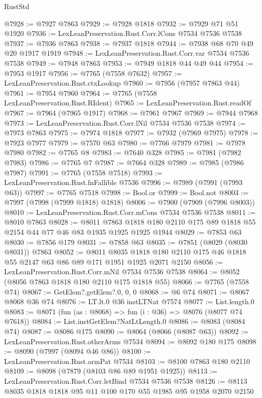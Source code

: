 \begin{lexlean}{RustStd}
\begin{coremodule}
@7928 := @7927 @7863
@7929 := @7928 @1818
@7932 := @7929 @71 @51 @1920
@7936 := LexLeanPreservation.Rust.Corr.lCons @7534 @7536 @7538
@7937 := @7936 @7863
@7938 := @7937 @1818
@7944 := @7938 @68 @70 @49 @20 @1917 @1919
@7948 := LexLeanPreservation.Rust.Corr.var @7534 @7536 @7538
@7949 := @7948 @7863
@7953 := @7949 @1818 @44 @49 @44
@7954 := @7953 @1917
@7956 := @7765 (@7558 @7632)
@7957 := LexLeanPreservation.Rust.ctxLookup
@7960 := @7956 (@7957 @7863 @44)
@7961 := @7954 @7960
@7964 := @7765 (@7558 LexLeanPreservation.Rust.RIdent)
@7965 := LexLeanPreservation.Rust.readOf
@7967 := @7964 (@7965 @1917)
@7968 := @7961 @7967
@7969 := @7944 @7968
@7973 := LexLeanPreservation.Rust.Corr.lNil @7534 @7536 @7538
@7974 := @7973 @7863
@7975 := @7974 @1818
@7977 := @7932 (@7969 @7975)
@7978 := @7923 @7977
@7979 := @7570 @63
@7980 := @7766 @7979
@7981 := @7978 @7980
@7982 := @7765 @8
@7983 := @7640 @328
@7985 := @7981 (@7982 @7983)
@7986 := @7765 @7
@7987 := @7664 @328
@7989 := @7985 (@7986 @7987)
@7991 := @7765 (@7558 @7518)
@7993 := LexLeanPreservation.Rust.fnFallible @7536
@7996 := @7989 (@7991 (@7993 @63))
@7997 := @7765 @7518
@7998 := Bool.or
@7999 := Bool.not
@8003 := @7997 (@7998 (@7999 @1818) @1818)
@8006 := @7900 (@7909 (@7996 @8003))
@8010 := LexLeanPreservation.Rust.Corr.mCons @7534 @7536 @7538
@8011 := @8010 @7863
@8028 := @8011
    @7863
    @1818
    @180
    @2110
    @175
    @89
    @1818
    @55
    @2154
    @44
    @77
    @46
    @83
    @1935
    @1925
    @1925
    @1944
@8029 := @7853 @63
@8030 := @7856 @179
@8031 := @7858 @63
@8035 := @7851 (@8029 (@8030 @8031)) @7863
@8052 := @8011
    @8035
    @1818
    @180
    @2110
    @175
    @46
    @1818
    @55
    @2147
    @63
    @86
    @89
    @171
    @1951
    @1925
    @2071
    @2150
@8056 := LexLeanPreservation.Rust.Corr.mNil @7534 @7536 @7538
@8064 := @8052 (@8056 @7863 @1818 @180 @2110 @175 @1818 @55)
@8066 := @7765 (@7558 @74)
@8067 := GetElem?.getElem?.{0, 0, 0}
@8068 := @6 @74
@8071 := @8067 @8068 @36 @74
@8076 := LT.lt.{0} @36 instLTNat @7574
@8077 := List.length.{0}
@8083 := @8071 (fun (as : @8068) => fun (i : @36) => @8076 (@8077 @74 @7618))
@8084 := List.instGetElem?NatLtLength.{0}
@8086 := @8083 (@8084 @74)
@8087 := @8086 @175
@8090 := @8064 (@8066 (@8087 @63))
@8092 := LexLeanPreservation.Rust.otherArms @7534
@8094 := @8092 @180 @175
@8098 := @8090 (@7997 (@8094 @46 @86))
@8100 := LexLeanPreservation.Rust.armPat @7534
@8103 := @8100 @7863 @180 @2110
@8109 := @8098 (@7879 (@8103 @86 @89 @1951 @1925))
@8113 := LexLeanPreservation.Rust.Corr.letBind @7534 @7536 @7538
@8126 := @8113 @8035 @1818 @1818 @95 @11 @100 @170 @55 @1985 @95 @1958 @2070 @2150

\end{coremodule}
\end{lexlean}
